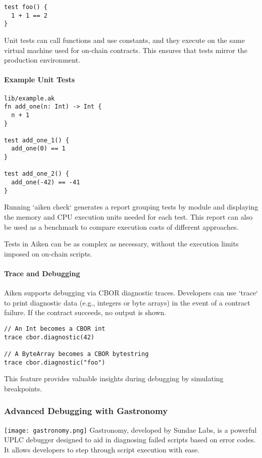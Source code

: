 \begin{verbatim}
test foo() {
  1 + 1 == 2
}
\end{verbatim}

Unit tests can call functions and use constants, and they execute on the same virtual machine used for on-chain contracts. This ensures that tests mirror the production environment.

\paragraph{Example Unit Tests}

\begin{verbatim}
lib/example.ak
fn add_one(n: Int) -> Int {
  n + 1
}
 
test add_one_1() {
  add_one(0) == 1
}
 
test add_one_2() {
  add_one(-42) == -41
}
\end{verbatim}

Running `aiken check` generates a report grouping tests by module and displaying the memory and CPU execution units needed for each test. This report can also be used as a benchmark to compare execution costs of different approaches.

Tests in Aiken can be as complex as necessary, without the execution limits imposed on on-chain scripts.

\paragraph{Trace and Debugging}

Aiken supports debugging via CBOR diagnostic traces. Developers can use `trace` to print diagnostic data (e.g., integers or byte arrays) in the event of a contract failure. If the contract succeeds, no output is shown.

\begin{verbatim}
// An Int becomes a CBOR int
trace cbor.diagnostic(42)
 
// A ByteArray becomes a CBOR bytestring
trace cbor.diagnostic("foo")
\end{verbatim}

This feature provides valuable insights during debugging by simulating breakpoints.

\subsubsection{Advanced Debugging with Gastronomy}
\texttt{[image: gastronomy.png]}
Gastronomy, developed by Sundae Labs, is a powerful UPLC debugger designed to aid in diagnosing failed scripts based on error codes. It allows developers to step through script execution with ease.

